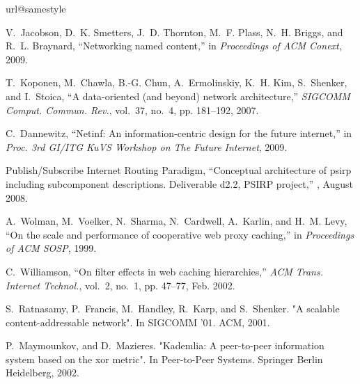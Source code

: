 \documentclass{sigcomm-alternate}
\begin{document}
\begin{thebibliography}{10}
\providecommand{\url}[1]{#1}
\csname url@samestyle\endcsname
\providecommand{\newblock}{\relax}
\providecommand{\bibinfo}[2]{#2}
\providecommand{\BIBentrySTDinterwordspacing}{\spaceskip=0pt\relax}
\providecommand{\BIBentryALTinterwordstretchfactor}{4}
\providecommand{\BIBentryALTinterwordspacing}{\spaceskip=\fontdimen2\font plus
\BIBentryALTinterwordstretchfactor\fontdimen3\font minus
  \fontdimen4\font\relax}
\providecommand{\BIBforeignlanguage}[2]{{\expandafter\ifx\csname l@#1\endcsname\relax
\typeout{** WARNING: IEEEtran.bst: No hyphenation pattern has been}\typeout{** loaded for the language `#1'. Using the pattern for}\typeout{** the default language instead.}\else
\language=\csname l@#1\endcsname
\fi
#2}}
\providecommand{\BIBdecl}{\relax}
\BIBdecl

V.~Jacobson, D.~K. Smetters, J.~D. Thornton, M.~F. Plass, N.~H. Briggs, and
  R.~L. Braynard, ``Networking named content,'' in \emph{Proceedings of 
  ACM Conext}, 2009.

T.~Koponen, M.~Chawla, B.-G. Chun, A.~Ermolinskiy, K.~H. Kim, S.~Shenker, and
  I.~Stoica, ``A data-oriented (and beyond) network architecture,''
  \emph{SIGCOMM Comput. Commun. Rev.}, vol.~37, no.~4, pp. 181--192, 2007.

C.~Dannewitz, ``Netinf: An information-centric design for the future
  internet,'' in \emph{Proc. 3rd GI/ITG KuVS Workshop on The Future Internet},
  2009.

{Publish/Subscribe Internet Routing Paradigm}, ``{Conceptual architecture of
  psirp including subcomponent descriptions. Deliverable d2.2, PSIRP
  project},'' \emph{{}}, August 2008.

A.~Wolman, M.~Voelker, N.~Sharma, N.~Cardwell, A.~Karlin, and H.~M. Levy, ``On
  the scale and performance of cooperative web proxy caching,'' in
  \emph{Proceedings of ACM SOSP}, 1999. 

C.~Williamson, ``On filter effects in web caching hierarchies,'' \emph{ACM
  Trans. Internet Technol.}, vol.~2, no.~1, pp. 47--77, Feb. 2002. 

S.~Ratnasamy, P.~Francis, M.~Handley, R.~Karp, and S.~Shenker. "A scalable content-addressable network". In SIGCOMM '01. ACM, 2001.

P.~Maymounkov, and D.~Mazieres. "Kademlia: A peer-to-peer information system based on the xor metric". In Peer-to-Peer Systems. Springer Berlin Heidelberg, 2002.


\end{thebibliography}
\end{document}
